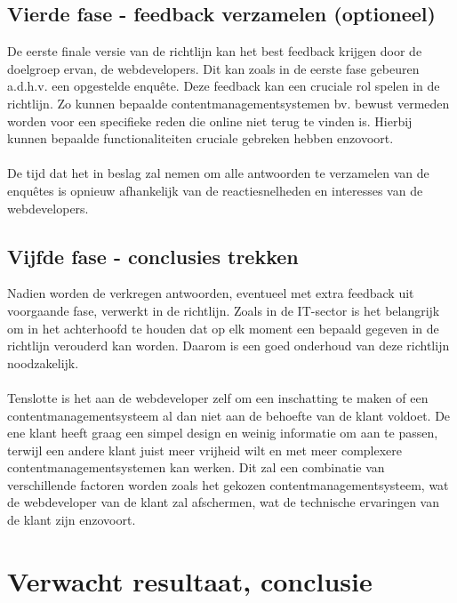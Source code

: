 \subsection{Vierde fase - feedback verzamelen (optioneel)}
De eerste finale versie van de richtlijn kan het best feedback krijgen door de doelgroep ervan, de webdevelopers. Dit kan zoals in de eerste fase gebeuren a.d.h.v. een opgestelde enquête. Deze feedback kan een cruciale rol spelen in de richtlijn. Zo kunnen bepaalde contentmanagementsystemen bv. bewust vermeden worden voor een specifieke reden die online niet terug te vinden is. Hierbij kunnen bepaalde functionaliteiten cruciale gebreken hebben enzovoort.  
\\\\
De tijd dat het in beslag zal nemen om alle antwoorden te verzamelen van de enquêtes is opnieuw afhankelijk van de reactiesnelheden en interesses van de webdevelopers.   

\subsection{Vijfde fase - conclusies trekken}
Nadien worden de verkregen antwoorden, eventueel met extra feedback uit voorgaande fase, verwerkt in de richtlijn.
Zoals in de IT-sector is het belangrijk om in het achterhoofd te houden dat op elk moment een bepaald gegeven in de richtlijn verouderd kan worden.  Daarom is een goed onderhoud van deze richtlijn noodzakelijk.
\\\\
Tenslotte is het aan de webdeveloper zelf om een inschatting te maken of een contentmanagementsysteem al dan niet aan de behoefte van de klant voldoet. De ene klant heeft graag een simpel design en weinig informatie om aan te passen, terwijl een andere klant juist meer vrijheid wilt en met meer complexere contentmanagementsystemen kan werken. Dit zal een combinatie van verschillende factoren worden zoals het gekozen contentmanagementsysteem, wat de webdeveloper van de klant zal afschermen, wat de technische ervaringen van de klant zijn enzovoort. 

\section{Verwacht resultaat, conclusie}%
\label{sec:verwachte_resultaten}


